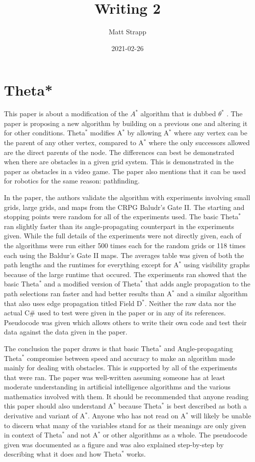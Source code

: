 \documentclass{article}
\title{Writing 2}
\author{Matt Strapp}
\date{2021-02-26}
\begin{document}
   \maketitle
   \section*{Theta*}
   This paper is about a modification of the $A^{\ast}$ algorithm that is dubbed $\theta^{\ast}$ \cite{paper}.
   The paper is proposing a new algorithm by building on a previous one and altering it for other conditions.
   Theta$^{\ast}$ modifies A$^{\ast}$ by allowing A$^{\ast}$ where any vertex can be the parent of any other vertex, compared to A$^{\ast}$ where the only successors allowed are the direct parents of the node.
   The differences can best be demonstrated when there are obstacles in a given grid system. This is demonstrated in the paper as obstacles in a video game. The paper also mentions that it can be used for robotics for the same reason: pathfinding.
   
   
   In the paper, the authors validate the algorithm with experiments involving small grids, large grids, and maps from the CRPG Baludr's Gate II.
   The starting and stopping points were random for all of the experiments used.
   The basic Theta$^{\ast}$ ran slightly faster than its angle-propagating counterpart in the experiments given.
   While the full details of the experiments were not directly given, each of the algorithms were run either 500 times each for the random grids or 118 times each using the Baldur's Gate II maps.
   The averages table was given of both the path lengths and the runtimes for everything except for A$^{\ast}$ using visibility graphs because of the large runtime that occured.
   The experiments ran showed that the basic Theta$^{\ast}$ and a modified version of Theta$^{\ast}$ that adds angle propagation to the path selections ran faster and had better results than A$^{\ast}$ and a similar algorithm that also uses edge propagation titled Field D$^{\ast}$.
   Neither the raw data nor the actual C\# used to test were given in the paper or in any of its references.
   Pseudocode was given which allows others to write their own code and test their data against the data given in the paper.


   The conclusion the paper draws is that basic Theta$^{\ast}$ and Angle-propagating Theta$^{\ast}$ compromise between speed and accuracy to make an algorithm made mainly for dealing with obstacles.
   This is supported by all of the experiments that were ran.
   The paper was well-written assuming someone has at least moderate understanding in artificial intelligence algorithms and the various mathematics involved with them.
   It should be recommended that anyone reading this paper should also understand A$^{\ast}$ because Theta$^{\ast}$ is best described as both a derivative and variant of A$^{\ast}$.
   Anyone who has not read on A$^{\ast}$ will likely be unable to discern what many of the variables stand for as their meanings are only given in context of Theta$^{\ast}$ and not A$^{\ast}$ or other algorithms as a whole.
   The pseudocode given was documented as a figure and was also explained step-by-step by describing what it does and how Theta$^{\ast}$ works.
   
\end{document}
